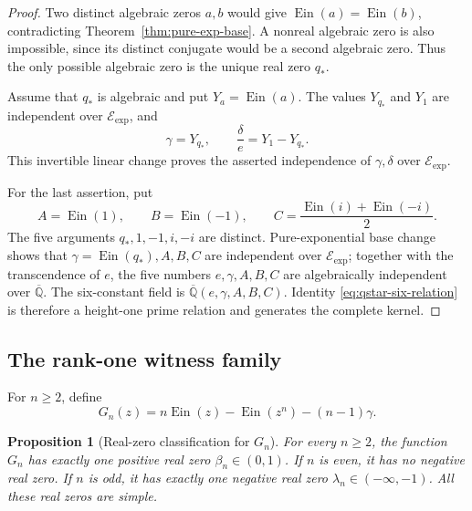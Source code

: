\documentclass[11pt]{article}
\newtheorem{proposition}[theorem]{Proposition}
\theoremstyle{definition}
\theoremstyle{remark}
\newcommand{\Qbar}{\overline{\mathbb Q}}
\newcommand{\Ein}{\operatorname{Ein}}
\newcommand{\Eexp}{\mathcal E_{\mathrm{exp}}}
\begin{document}
\begin{proof}
Two distinct algebraic zeros \(a,b\) would give
\(\Ein(a)=\Ein(b)\), contradicting
Theorem~\ref{thm:pure-exp-base}.  A nonreal algebraic zero is also
impossible, since its distinct conjugate would be a second algebraic zero.
Thus the only possible algebraic zero is the unique real zero \(q_*\).

Assume that \(q_*\) is algebraic and put \(Y_a=\Ein(a)\).  The values
\(Y_{q_*}\) and \(Y_1\) are independent over \(\Eexp\), and
\[
 \gamma=Y_{q_*},\qquad
 \frac{\delta}{e}=Y_1-Y_{q_*}.
\]
This invertible linear change proves the asserted independence of
\(\gamma,\delta\) over \(\Eexp\).

For the last assertion, put
\[
 A=\Ein(1),\qquad B=\Ein(-1),\qquad
 C=\frac{\Ein(i)+\Ein(-i)}2.
\]
The five arguments \(q_*,1,-1,i,-i\) are distinct.  Pure-exponential
base change shows that \(\gamma=\Ein(q_*),A,B,C\) are independent over
\(\Eexp\); together with the transcendence of \(e\), the five numbers
\(e,\gamma,A,B,C\) are algebraically independent over \(\Qbar\).
The six-constant field is \(\Qbar(e,\gamma,A,B,C)\).  Identity
\eqref{eq:qstar-six-relation} is therefore a height-one prime relation and
generates the complete kernel.
\end{proof}

\subsection{The rank-one witness family}

For \(n\ge2\), define
\begin{equation}\label{eq:Gn-witness-family}
 G_n(z)=n\Ein(z)-\Ein(z^n)-(n-1)\gamma.
\end{equation}

\begin{proposition}[Real-zero classification for \(G_n\)]
\label{prop:Gn-real-zero-classification}
For every \(n\ge2\), the function \(G_n\) has exactly one positive real zero
\(\beta_n\in(0,1)\).  If \(n\) is even, it has no negative real zero.  If
\(n\) is odd, it has exactly one negative real zero
\(\lambda_n\in(-\infty,-1)\).  All these real zeros are simple.
\end{proposition}
\end{document}
